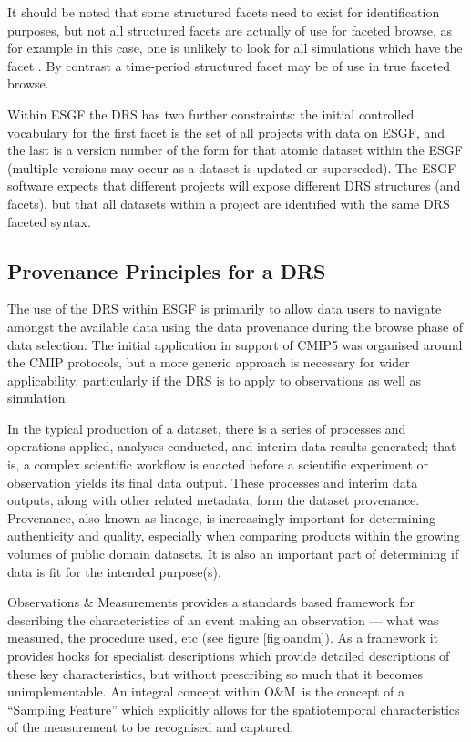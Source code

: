 \documentclass[final,1p,times,twocolumn,authoryear]{elsarticle}
\newcommand{\cvm}[1]{\protect{\texttt{{#1}}}}
\newcommand{\om}{O\&M}
\begin{document}
It should be noted that some structured facets need to exist for identification purposes, but not all structured facets are actually of use for faceted browse, as for example in this case, one is unlikely to look for all simulations which have the facet \cvm{r3i2p1}. By contrast a time-period structured facet may be of use in true faceted browse.

Within ESGF the DRS has two further constraints: the initial controlled vocabulary for the first facet is the set of all projects with data on ESGF, and the last is a version number of the form \cvm{vYYYYMMDD} for that atomic dataset within the ESGF (multiple versions may occur as a dataset is updated or superseded). 
The ESGF software expects that different projects will expose different DRS structures (and facets), but that all datasets within a project are identified with the same DRS faceted syntax. 

\subsection{Provenance Principles for a DRS}

The use of the DRS within ESGF is primarily to allow data users to navigate amongst the available data using the data provenance during the browse phase of data selection. 
The initial application in support of CMIP5 was organised around the CMIP protocols, but a more generic approach is necessary for wider applicability, particularly if the DRS is to apply to observations as well as simulation.

In the typical production of a dataset, there is a series of processes and operations applied, analyses conducted, and interim data results generated; that is, a complex scientific workflow is enacted before a scientific experiment or observation yields its final data output. These processes and interim data outputs, along with other related metadata, form the dataset provenance. Provenance, also known as lineage, is increasingly important for determining authenticity and quality, especially when comparing products within the growing volumes of public domain datasets. It is also an important part of determining if data is fit for the intended purpose(s). 

Observations \& Measurements \cite[\om; ][]{Cox2016} provides a standards based framework for describing the characteristics of an event making an observation --- what was measured, the procedure used, etc (see figure \ref{fig:oandm}). 
As a framework it provides hooks for specialist descriptions which provide detailed descriptions of these key characteristics, but without prescribing so much that it becomes unimplementable.
An integral concept within \om\ is the concept of a ``Sampling Feature'' which explicitly allows for the spatiotemporal characteristics of the measurement to be recognised and captured.
 
\end{document}
